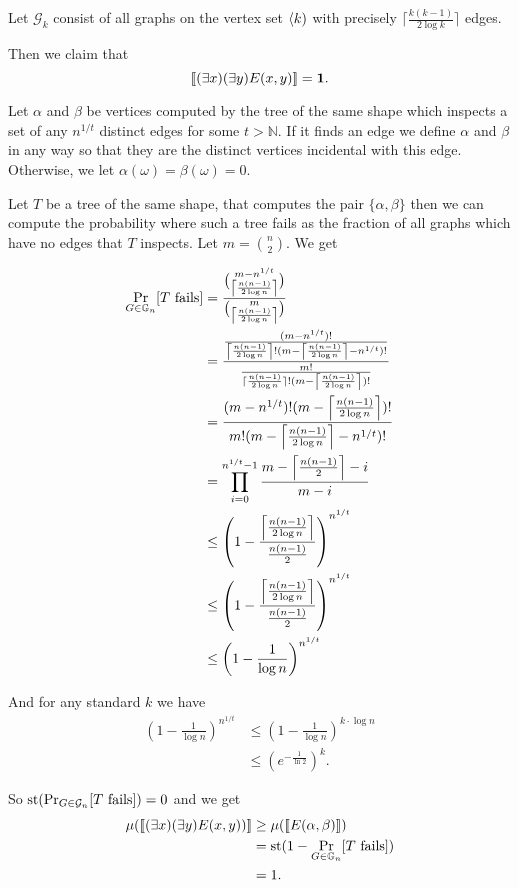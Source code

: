 \begin{exam}\label{examsparseedge}
Let $\mathcal{G}_k$ consist of all graphs on the vertex set $\langle k)$ with precisely $\lceil\frac{k(k-1)}{2\log k}\rceil$ edges.

Then we claim that
\[[\![(\exists x)(\exists y)E(x,y)]\!]=\textbf{1}.\]

Let $\alpha$ and $\beta$ be vertices computed by the tree of the same shape which inspects a set of any $n^{1/t}$ distinct edges for some $t>\mathbb{N}$. If it finds an edge we define $\alpha$ and $\beta$ in any way so that they are the distinct vertices incidental with this edge. Otherwise, we let $\alpha(\omega)=\beta(\omega)=0$.

Let $T$ be a tree of the same shape, that computes the pair $\{\alpha,\beta\}$ then we can compute the probability where such a tree fails as the fraction of all graphs which have no edges that $T$ inspects. Let $m=\binom{n}{2}$. We get

\begin{align}
\Pr_{G\in\mathbb{G}_n}[T\text{ fails}]&=\frac{\binom{m-n^{1/t}}{\left \lceil { \frac{n(n-1)}{2\log n}} \right \rceil }}{\binom{m}{\left \lceil { \frac{n(n-1)}{2\log n}} \right \rceil}}\\
&=\frac{\frac{(m-n^{1/t})!}{\left \lceil {\frac{n(n-1)}{2\log n}} \right \rceil ! (m-\left \lceil { \frac{n(n-1)}{2\log n}} \right \rceil-n^{1/t})!}}{\frac{m!}{\lceil \frac{n(n-1)}{2\log n}\rceil!(m-\left \lceil {\frac{n(n-1)}{2\log n}} \right \rceil)!}}\\
&=\frac{(m-n^{1/t})!(m-\left \lceil { \frac{n(n-1)}{2\log n}} \right \rceil)!}{m!(m-\left \lceil {\frac{n(n-1)}{2\log n}} \right \rceil-n^{1/t})!}\\
&=\prod_{i=0}^{n^{1/t}-1}\frac{m-\left \lceil {\frac{n(n-1)}{2}} \right \rceil-i}{m-i}\\
&\leq\left(1-\frac{\left \lceil {\frac{n(n-1)}{2\log n}} \right \rceil}{\frac{n(n-1)}{2}}\right)^{n^{1/t}}\\
&\leq\left(1-\frac{\left \lceil {\frac{n(n-1)}{2\log n}} \right \rceil}{\frac{n(n-1)}{2}}\right)^{n^{1/t}}\\
&\leq\left(1-\frac{1}{\log n}\right)^{n^{1/t}}
\end{align}

And for any standard $k$ we have
\begin{align}
\left(1-\frac{1}{\log n}\right)^{n^{1/t}}&\leq\left(1-\frac{1}{\log n}\right)^{k\cdot \log n}\\
&\leq (e^{-\frac{1}{\ln 2}})^k.
\end{align}

So $\text{st}(\Pr_{G\in\mathcal{G}_n}[T\text{ fails}])=0$ and we get 
\begin{align}
\mu([\![(\exists x)(\exists y)E(x,y)) ]\!] &\geq \mu([\![ E(\alpha,\beta)]\!])\\
&=\text{st}(1-\Pr_{G\in\mathbb{G}_n}[T\text{ fails}])\\
&=1.
\end{align}
\end{exam}

